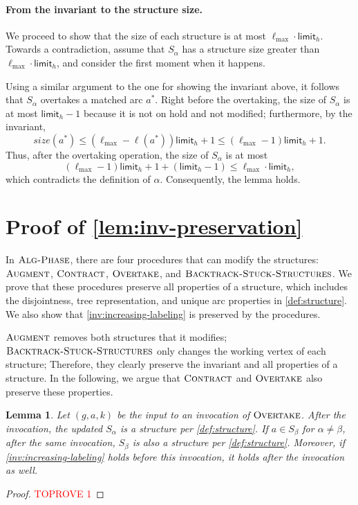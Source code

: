 \documentclass{article}
\newcommand{\alp}{\alpha}
\newcommand{\lmax}{\ell_{\max}}
\newcommand{\limit}{\mathsf{limit}}
\newcommand{\algPhase}{\textsc{Alg-Phase}\xspace}
\newcommand{\algBacktrack}{\textsc{Backtrack-Stuck-Structures}\xspace}
\newcommand{\algOvertake}{\textsc{Overtake}\xspace}
\newcommand{\algAugment}{\textsc{Augment}\xspace}
\newcommand{\algContract}{\textsc{Contract}\xspace}
\newtheorem{lemma}[theorem]{Lemma}
\begin{document}
\paragraph{From the invariant to the structure size.}
We proceed to show that the size of each structure is at most $\lmax \cdot \limit_h$.
Towards a contradiction, assume that $S_\alp$ has a structure size greater than $\lmax \cdot \limit_h$, and consider the first moment when it happens.

Using a similar argument to the one for showing the invariant above, it follows that $S_\alp$ overtakes a matched arc $a^*$.
Right before the overtaking, the size of $S_\alp$ is at most $\limit_h - 1$ because it is not on hold and not modified;
furthermore, by the invariant,
\[
    size(a^*) \leq (\lmax - \ell(a^*))\limit_h + 1 \leq (\lmax - 1)\limit_h + 1.
\]
Thus, after the overtaking operation, the size of $S_\alp$ is at most 
\[
(\lmax - 1)\limit_h + 1 + (\limit_h - 1) \leq \lmax \cdot \limit_h,
\]
which contradicts the definition of $\alp$.
Consequently, the lemma holds.








\appendix

\section{Proof of \cref{lem:inv-preservation}} \label{sec:appendix-inv}

In $\algPhase$, there are four procedures that can modify the structures:
$\algAugment$, $\algContract$, $\algOvertake$, and $\algBacktrack$.
We prove that these procedures preserve all properties of a structure, which includes the disjointness, tree representation, and unique arc properties in \cref{def:structure}.
We also show that \cref{inv:increasing-labeling} is preserved by the procedures.

$\algAugment$ removes both structures that it modifies;
$\algBacktrack$ only changes the working vertex of each structure;
Therefore, they clearly preserve the invariant and all properties of a structure.
In the following, we argue that $\algContract$ and $\algOvertake$ also preserve these properties.

\begin{lemma} \label{lem:appendix1} Let $(g, a, k)$ be the input to an invocation of $\algOvertake$.
After the invocation, the updated $S_\alp$ is a structure per \cref{def:structure}.
If $a \in S_\beta$ for $\alp \neq \beta$, after the same invocation, $S_\beta$ is
also a structure per \cref{def:structure}.
Moreover, if \cref{inv:increasing-labeling} holds before this invocation, it holds after the invocation as well.
\end{lemma}
\begin{proof}\textcolor{red}{TOPROVE 1}\end{proof}
\end{document}
